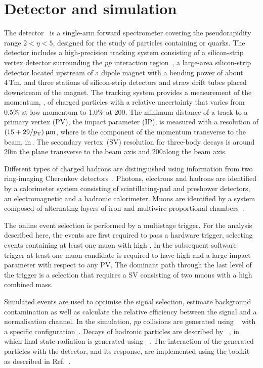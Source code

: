 \section{Detector and simulation}
\label{sec:Detector}

The \lhcb detector~\cite{Alves:2008zz,LHCb-DP-2014-002} is a single-arm forward spectrometer covering the \mbox{pseudorapidity} range $2<\eta <5$, designed for the study of particles containing \bquark or \cquark quarks. The detector includes a high-precision tracking system consisting of a silicon-strip vertex detector surrounding the $pp$ interaction region~\cite{LHCb-DP-2014-001}, a large-area silicon-strip detector located upstream of a dipole magnet with a bending power of about $4{\mathrm{\,Tm}}$, and three stations of silicon-strip detectors and straw drift tubes placed downstream of the magnet. The tracking system provides a measurement of the momentum, \ptot, of charged particles with a relative uncertainty that varies from 0.5\% at low momentum to 1.0\% at 200\gevc.  The minimum distance of a track to a primary vertex (PV), the impact parameter (IP), is measured with a resolution of $(15+29/\mbox{$p_{\mathrm{ T}}$}){\,\upmu\mathrm{m}}$, where \pt is the component of the momentum transverse to the beam, in\,\gevc.  The secondary vertex~(SV) resolution for three-body decays is around 20\mum in the plane transverse to the beam axis and 200\mum along the beam axis.

Different types of charged hadrons are distinguished using information from two ring-imaging Cherenkov detectors~\cite{LHCb-DP-2012-003}. Photons, electrons and hadrons are identified by a calorimeter system consisting of scintillating-pad and preshower detectors, an electromagnetic and a hadronic calorimeter. Muons are identified by a system composed of alternating layers of iron and multiwire proportional chambers~\cite{LHCb-DP-2012-002}.

The online event selection is performed by a multistage trigger\cite{LHCb-DP-2012-004}. For the analysis described here, the events are first required to pass a hardware trigger, selecting events containing at least one muon with high \pt. In the subsequent software trigger at least one muon candidate is required to have high \pt and a large impact parameter with respect to any PV. The dominant path through the last level of the trigger is a selection that requires a SV consisting of two muons with a high combined mass.

Simulated events are used to optimise the signal selection, estimate background contamination as well as calculate the relative efficiency between the signal and a normalisation channel. In the simulation, $pp$ collisions are generated using \pythia~\cite{Sjostrand:2006za,*Sjostrand:2007gs} with a specific \lhcb configuration~\cite{LHCb-PROC-2010-056}. Decays of hadronic particles are described by \evtgen~\cite{Lange:2001uf}, in which final-state radiation is generated using \photos~\cite{Golonka:2005pn}. The interaction of the generated particles with the detector, and its response, are implemented using the \geant toolkit~\cite{Allison:2006ve, *Agostinelli:2002hh} as described in Ref.~\cite{LHCb-PROC-2011-006}.

